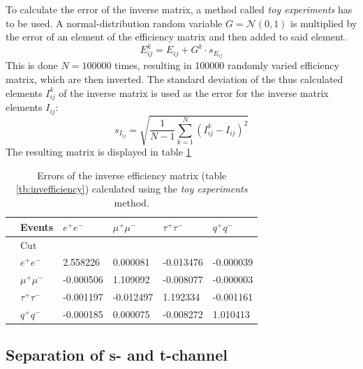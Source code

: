 To calculate the error of the inverse matrix, a method called \emph{toy experiments} has to be used. A normal-distribution random variable $G=\mathcal{N}(0,1)$ is multiplied by the error of an element of the efficiency matrix and then added to said element.
\begin{equation}
E^{k}_{ij}=E_{ij}+G^k\cdot s_{E_{ij}}
\end{equation}
This is done $N=100000$ times, resulting in 100000 randomly varied efficiency matrix, which are then inverted. The standard deviation of the thus calculated elements $I^k_{ij}$ of the inverse matrix is used as the error for the inverse matrix elements $I_{ij}$: 
\begin{equation}
s_{I_{ij}}=\sqrt{\frac{1}{N-1}\sum_{k=1}^{N}\left(I^k_{ij}-I_{ij}\right)^2}
\end{equation}
The resulting matrix is displayed in table \ref{tb:invefficiencyerror}
\begin{table}[H]\centering
	\begin{tabular}{@{}llllll@{}}
		\toprule
		&Events &$e^+e^-$&$\mu^+\mu^-$&$\tau^+\tau^-$&$q^+q^-$\\
		\midrule
		&Cut&&&&\\
		&$e^+e^-$&2.558226&0.000081&-0.013476&-0.000039\\
		&$\mu^+\mu^-$&-0.000506&1.109092&-0.008077&-0.000003\\
		&$\tau^+\tau^-$&-0.001197&-0.012497&1.192334&-0.001161\\
		&$q^+q^-$&-0.000185&0.000075&-0.008272&1.010413\\
		\bottomrule
	\end{tabular}
	\caption[Inverse efficiency error matrix]{Errors of the inverse efficiency matrix (table \ref{tb:invefficiency}) calculated using the \emph{toy experiments} method.}
	\label{tb:invefficiencyerror}
\end{table}

\subsection{Separation of s- and t-channel}
